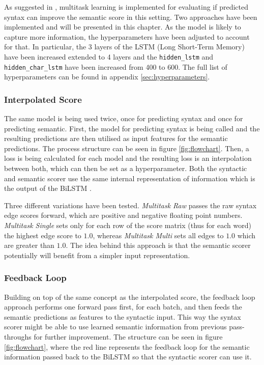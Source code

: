 \documentclass[11pt]{scrartcl}
\begin{document}
As suggested in \cite{kurtz-etal-2019-improving}, multitask learning is implemented for evaluating if predicted syntax can improve the semantic score in this setting. Two approaches have been implemented and will be presented in this chapter. As the model is likely to capture more information, the hyperparameters have been adjusted to account for that. In particular, the 3 layers of the LSTM (Long Short-Term Memory) have been increased extended to 4 layers and the \texttt{hidden\_lstm} and \texttt{hidden\_char\_lstm} have been increased from 400 to 600. The full list of hyperparameters can be found in appendix \ref{sec:hyperparameters}.

\subsubsection{Interpolated Score}

The same model is being used twice, once for predicting syntax and once for predicting semantic. First, the model for predicting syntax is being called and the resulting predictions are then utilised as input features for the semantic predictions. The process structure can be seen in figure \ref{fig:flowchart}. Then, a loss is being calculated for each model and the resulting loss is an interpolation between both, which can then be set as a hyperparameter. Both the syntactic and semantic scorer use the same internal representation of information which is the output of the BiLSTM .

Three different variations have been tested. \textit{Multitask Raw} passes the raw syntax edge scores forward, which are positive and negative floating point numbers. \textit{Multitask Single} sets only for each row of the score matrix (thus for each word) the highest edge score to $1.0$, whereas \textit{Multitask Multi} sets all edges to $1.0$ which are greater than $1.0$. The idea behind this approach is that the semantic scorer potentially will benefit from a simpler input representation.

\subsubsection{Feedback Loop}

Building on top of the same concept as the interpolated score, the feedback loop approach performs one forward pass first, for each batch, and then feeds the semantic predictions as features to the syntactic input. This way the syntax scorer might be able to use learned semantic information from previous pass-throughs for further improvement. The structure can be seen in figure \ref{fig:flowchart}, where the red line represents the feedback loop for the semantic information passed back to the BiLSTM so that the syntactic scorer can use it. 
\end{document}
